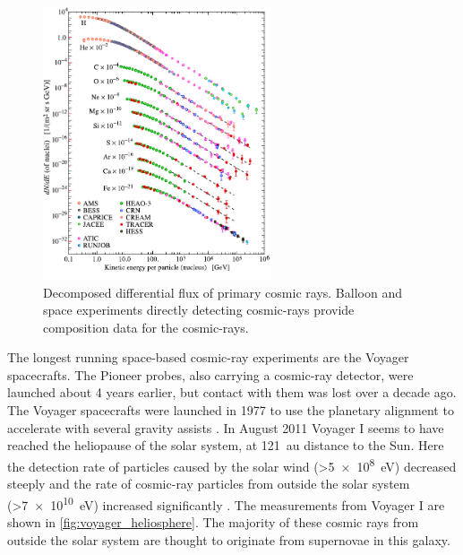 \begin{figure}
    \centering
    \includegraphics[width=0.6\textwidth]
                    {plots/cosmic-rays/PDG_28_1_fluxes_per_nucleus.pdf}
    \caption{Decomposed differential flux of primary cosmic rays. Balloon and space experiments directly detecting cosmic-rays provide composition data for the cosmic-rays.}
    \label{fig:PDG_28_1_fluxes_per_nucleus}
\end{figure}

The longest running space-based cosmic-ray experiments are the Voyager spacecrafts. The Pioneer probes, also carrying a cosmic-ray detector, were launched about 4 years earlier, but contact with them was lost over a decade ago. The Voyager spacecrafts were launched in 1977 to use the planetary alignment to accelerate with several gravity assists \cite{stone1977voyager}. In August 2011 Voyager I seems to have reached the heliopause of the solar system, at \SI{121}{\astronomicalunit} distance to the Sun. Here the detection rate of particles caused by the solar wind (>\SI{5e8}{\eV}) decreased steeply and the rate of cosmic-ray particles from outside the solar system (>\SI{7e10}{\eV}) increased significantly \cite{stone2013voyager}. The measurements from Voyager I are shown in \cref{fig:voyager_heliosphere}. The majority of these cosmic rays from outside the solar system are thought to originate from supernovae in this galaxy.

